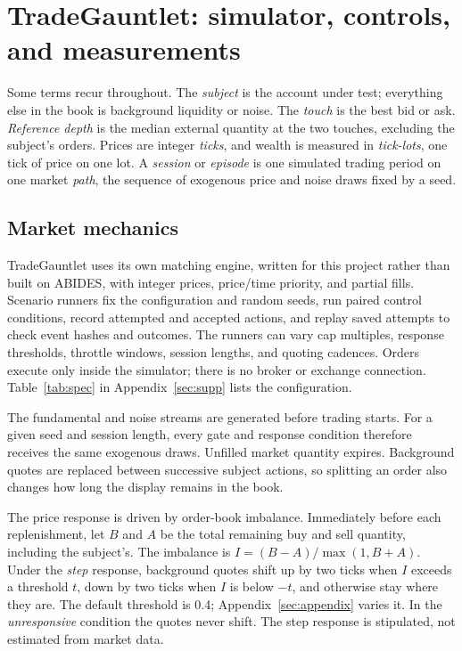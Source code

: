 \documentclass{article}
\begin{document}
\section{TradeGauntlet: simulator, controls, and measurements}

Some terms recur throughout. The \emph{subject} is the account under test; everything else in the book is background liquidity or noise. The \emph{touch} is the best bid or ask. \emph{Reference depth} is the median external quantity at the two touches, excluding the subject's orders. Prices are integer \emph{ticks}, and wealth is measured in \emph{tick-lots}, one tick of price on one lot. A \emph{session} or \emph{episode} is one simulated trading period on one market \emph{path}, the sequence of exogenous price and noise draws fixed by a seed.

\subsection{Market mechanics}\label{sec:market}

TradeGauntlet uses its own matching engine, written for this project rather than built on ABIDES, with integer prices, price/time priority, and partial fills. Scenario runners fix the configuration and random seeds, run paired control conditions, record attempted and accepted actions, and replay saved attempts to check event hashes and outcomes. The runners can vary cap multiples, response thresholds, throttle windows, session lengths, and quoting cadences. Orders execute only inside the simulator; there is no broker or exchange connection. Table~\ref{tab:spec} in Appendix~\ref{sec:supp} lists the configuration.

The fundamental and noise streams are generated before trading starts. For a given seed and session length, every gate and response condition therefore receives the same exogenous draws. Unfilled market quantity expires. Background quotes are replaced between successive subject actions, so splitting an order also changes how long the display remains in the book.

The price response is driven by order-book imbalance. Immediately before each replenishment, let $B$ and $A$ be the total remaining buy and sell quantity, including the subject's. The imbalance is $I = (B - A)/\max(1, B + A)$. Under the \emph{step} response, background quotes shift up by two ticks when $I$ exceeds a threshold $t$, down by two ticks when $I$ is below $-t$, and otherwise stay where they are. The default threshold is 0.4; Appendix~\ref{sec:appendix} varies it. In the \emph{unresponsive} condition the quotes never shift. The step response is stipulated, not estimated from market data.
\end{document}
